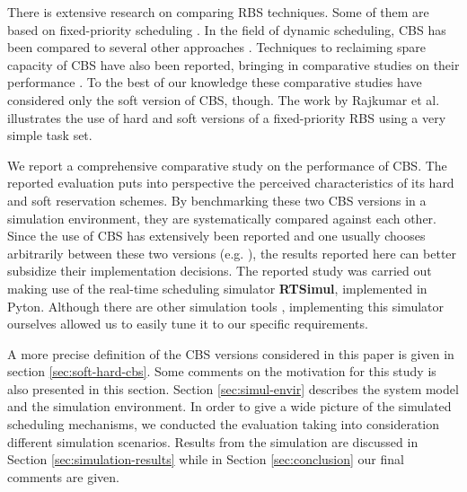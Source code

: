 \documentclass[times, 10pt,twocolumn]{article}
\newcommand{\simul}{\textbf{RTSimul}} %
\begin{document}

There is extensive research on comparing RBS
techniques.  Some of them are based on fixed-priority scheduling
\cite{bernat.ea99:new,bernat.ea02:multiple,davis.ea05:hierarchical,davis.ea95:dual}.
In the field of dynamic scheduling, CBS has been compared to several
other approaches \cite{spuri.ea96:scheduling}.  Techniques to
reclaiming spare capacity of CBS have also been reported, bringing in
comparative studies on their performance
\cite{caccamo.ea00:capacity,lin.ea05:improving}. To the best of our
knowledge these comparative studies have considered only the soft
version of CBS, though.  The work by Rajkumar et
al. \cite{rajkumar.ea01:resource} illustrates the use of hard and soft
versions of a fixed-priority RBS using a very simple task set.

\label{sec:contr-this-paper}

We report a comprehensive comparative study on the performance of
CBS. The reported evaluation puts into perspective the perceived
characteristics of its hard and soft reservation schemes.  By
benchmarking these two CBS versions in a simulation environment, they
are systematically compared against each other.  Since the use of CBS
has extensively been reported and one usually chooses arbitrarily
between these two versions
(e.g. \cite{abeni.ea99:adaptive,abeni.ea05:qos}), the results reported
here can better subsidize their implementation decisions.  The
reported study was carried out making use of the real-time scheduling
simulator \simul{}, implemented in Pyton. Although there are other
simulation tools \cite{ancilotti.ea96:flexible}, implementing this
simulator ourselves allowed us to easily tune it to our specific
requirements.

\label{sec:structure-this-paper}

A more precise definition of the CBS versions considered in this
paper is given in section \ref{sec:soft-hard-cbs}. Some comments on the motivation for 
this study is also presented in this section.  
Section \ref{sec:simul-envir} describes the system model and the
simulation environment.  In order to give a wide picture of the
simulated scheduling mechanisms, we conducted the evaluation taking
into consideration different simulation scenarios. Results from the
simulation are discussed in Section \ref{sec:simulation-results} while
in Section \ref{sec:conclusion} our final comments are given.
\end{document}
